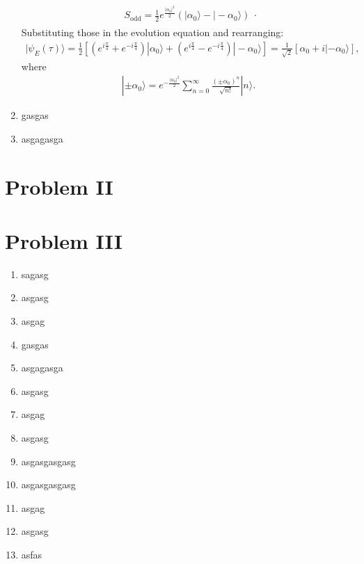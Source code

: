 \documentclass[letterpaper,11pt,twoside]{article}
\newcommand{\ket}[1]{|#1\rangle}
\begin{document}
\begin{enumerate}[itemsep=0pt,topsep=0pt,label=\alph*)]
\begin{align*}
\begin{array}{l}
      S_{\text{odd}}=\frac{1}{2}e^{\frac{|\alpha_0|^2}{2}}(\ket{\alpha_0}-\ket{-\alpha_0})
    \end{array}.
  \end{align*}
  Substituting those in the evolution equation and rearranging:
  \begin{align*}
    \ket{\psi_E(\tau)}=\frac{1}{2}\left[(e^{i\frac{\pi}{4}}+e^{-i\frac{\pi}{4}})\ket{\alpha_0}+(e^{i\frac{\pi}{4}}-e^{-i\frac{\pi}{4}})\ket{-\alpha_0}\right]=\frac{1}{\sqrt{2}}[\alpha_0+i\ket{-\alpha_0}],
  \end{align*}
  where 
  \begin{align*}
    \ket{\pm\alpha_0}=e^{-\frac{|\alpha_0|^2}{2}}\sum_{n=0}^\infty\frac{(\pm\alpha_0)^n}{\sqrt{n!}}\ket{n}.
  \end{align*}
  \item gasgas
  \item asgagasga
\end{enumerate}
\section*{Problem II}

\section*{Problem III}
\begin{enumerate}[itemsep=0pt,topsep=0pt,label=\alph*)]
  \item sagasg
  \item asgasg
  \item asgag
  \item gasgas
  \item asgagasga
  \item asgasg
  \item asgag
  \item asgasg
  \item asgasgasgasg
  \item asgasgasgasg
  \item asgag
  \item asgasg
  \item asfas
\end{enumerate}

\end{document}
